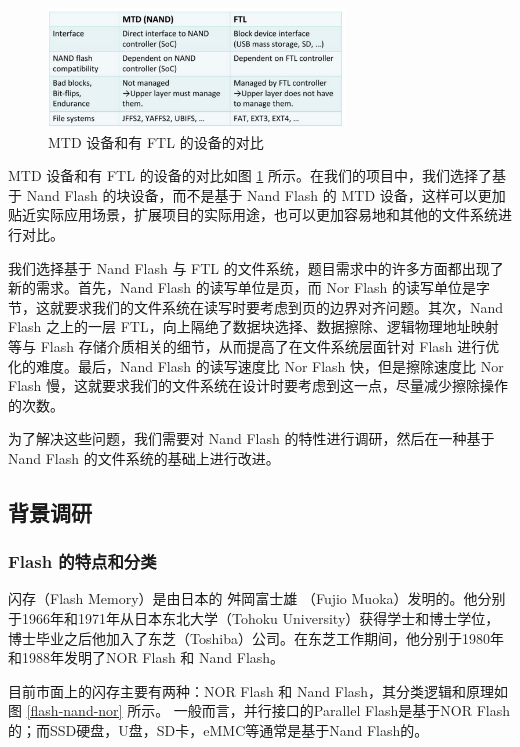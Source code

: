 \begin{figure}[htbp]
  \centering
  \includegraphics[width=0.7\textwidth]{fig/flash-mtd-ftl.png}
  \caption{MTD 设备和有 FTL 的设备的对比}
  \label{flash-mtd-ftl}
\end{figure}

MTD 设备和有 FTL 的设备的对比如图 \ref{flash-mtd-ftl} 所示。在我们的项目中，我们选择了基于 Nand Flash 的块设备，而不是基于 Nand Flash 的 MTD 设备，这样可以更加贴近实际应用场景，扩展项目的实际用途，也可以更加容易地和其他的文件系统进行对比。

我们选择基于 Nand Flash 与 FTL 的文件系统，题目需求中的许多方面都出现了新的需求。首先，Nand Flash 的读写单位是页，而 Nor Flash 的读写单位是字节，这就要求我们的文件系统在读写时要考虑到页的边界对齐问题。其次，Nand Flash 之上的一层 FTL，向上隔绝了数据块选择、数据擦除、逻辑物理地址映射等与 Flash 存储介质相关的细节，从而提高了在文件系统层面针对 Flash 进行优化的难度。最后，Nand Flash 的读写速度比 Nor Flash 快，但是擦除速度比 Nor Flash 慢，这就要求我们的文件系统在设计时要考虑到这一点，尽量减少擦除操作的次数。

为了解决这些问题，我们需要对 Nand Flash 的特性进行调研，然后在一种基于 Nand Flash 的文件系统的基础上进行改进。

\subsection{背景调研}

\subsubsection{Flash 的特点和分类}

闪存（Flash Memory）是由日本的 舛岡富士雄 （Fujio Muoka）发明的。他分别于1966年和1971年从日本东北大学（Tohoku University）获得学士和博士学位，博士毕业之后他加入了东芝（Toshiba）公司。在东芝工作期间，他分别于1980年和1988年发明了NOR Flash 和 Nand Flash。

目前市面上的闪存主要有两种：NOR Flash 和 Nand Flash，其分类逻辑和原理如图 \ref {flash-nand-nor} 所示。
一般而言，并行接口的Parallel Flash是基于NOR Flash的；而SSD硬盘，U盘，SD卡，eMMC等通常是基于Nand Flash的。

